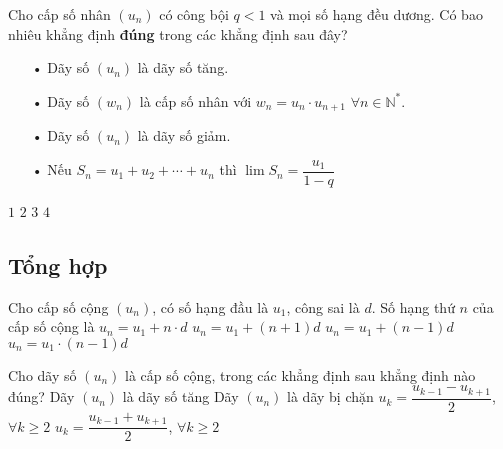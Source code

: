 \begin{ex}%
	Cho cấp số nhân $\left (u_n\right )$ có công bội $q<1$ và  mọi số hạng đều dương. Có bao nhiêu khẳng định \textbf{đúng}  trong các khẳng định sau đây?
	\begin{enumerate}
		\item[•] Dãy số $\left (u_n\right )$ là dãy số tăng.
		\item[•] Dãy số $\left (w_n\right )$ là cấp số nhân với $w_n =u_n \cdot u_{n+1}$ $\forall n \in \mathbb{N}^*$.
		\item[•] Dãy số $\left (u_n\right )$ là dãy số giảm.
		\item[•] Nếu $S_n=u_1 + u_2 + \cdots + u_n$ thì $ \lim S_n = \dfrac{u_1}{1-q}$
	\end{enumerate}
	\choice
	{$1$}
	{$2$}
	{\True $3$}
	{$4$}
\end{ex}

\subsection{Tổng hợp}
\begin{ex}%
	Cho cấp số cộng $ \left(u_n\right) $, có số hạng đầu là $ u_1 $, công sai là $ d $. Số hạng thứ $ n $ của cấp số cộng là
	\choice
	{$ u_n = u_1 + n \cdot d $}
	{$ u_n = u_1 + (n+1)d $}
	{\True $ u_n = u_1 + (n-1)d $}
	{$ u_n = u_1 \cdot (n-1)d $}
\end{ex}

\begin{ex}%
	Cho dãy số $ \left(u_n\right) $	là cấp số cộng, trong các khẳng định sau khẳng định nào đúng?
	\choice
	{Dãy $ \left(u_n\right) $ là dãy số tăng}
	{Dãy $ \left(u_n\right) $ là dãy bị chặn}
	{$ u_k = \dfrac{u_{k-1}-u_{k+1}}{2}$, $\forall k \ge 2 $}
	{\True $ u_k = \dfrac{u_{k-1}+u_{k+1}}{2}$, $\forall k \ge 2 $}
\end{ex}

